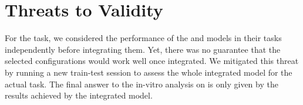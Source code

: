 \section{Threats to Validity}
\label{sec:ttv}



For the \matching task, we considered the performance of the \finder and \linker models in their tasks independently before integrating them.
Yet, there was no guarantee that the selected configurations would work well once integrated.
We mitigated this threat by running a new train-test session to assess the whole integrated model for the actual \matching task.
The final answer to the in-vitro analysis on \rqTwo is only given by the results achieved by the integrated model.

